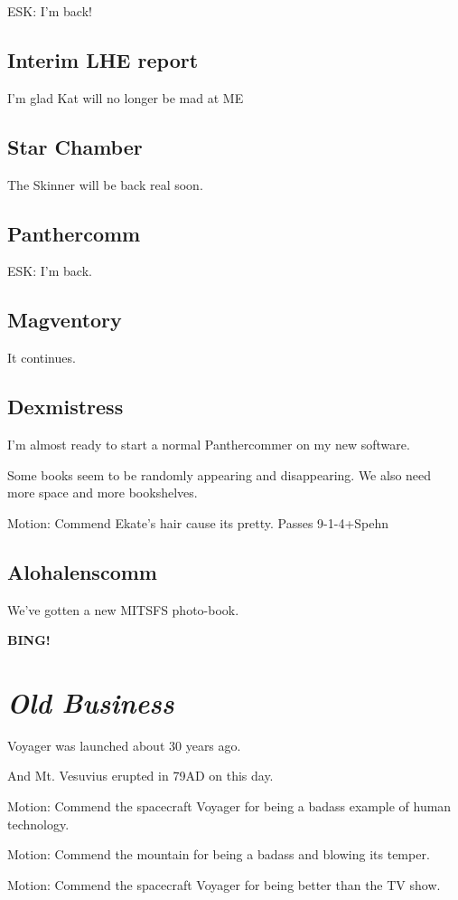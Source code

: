 \documentclass[10pt]{article}
\newcommand{\bing}{{\bf BING!} }
\newcommand{\goto}[1]{\bing \vskip 12pt \section*{{\em{#1}}}}
\begin{document}
ESK: I'm back!

\subsection*{Interim LHE report}

I'm glad Kat will no longer be mad at ME
\subsection*{Star Chamber}

The Skinner will be back real soon.

\subsection*{Panthercomm}

ESK:  I'm back.

\subsection*{Magventory}

It continues.

\subsection*{Dexmistress}

I'm almost ready to start a normal Panthercommer on my new software.

Some books seem to be randomly appearing and disappearing.  We also need more space and more bookshelves.

Motion:  Commend Ekate's hair cause its pretty.  Passes 9-1-4+Spehn

\subsection*{Alohalenscomm}

We've gotten a new MITSFS photo-book.

\goto{Old Business}

Voyager was launched about 30 years ago.

And Mt. Vesuvius erupted in 79AD on this day.

Motion:  Commend the spacecraft Voyager for being a badass example of human technology.

Motion:  Commend the mountain for being a badass and blowing its temper.

Motion:  Commend the spacecraft Voyager for being better than the TV show.
\end{document}
